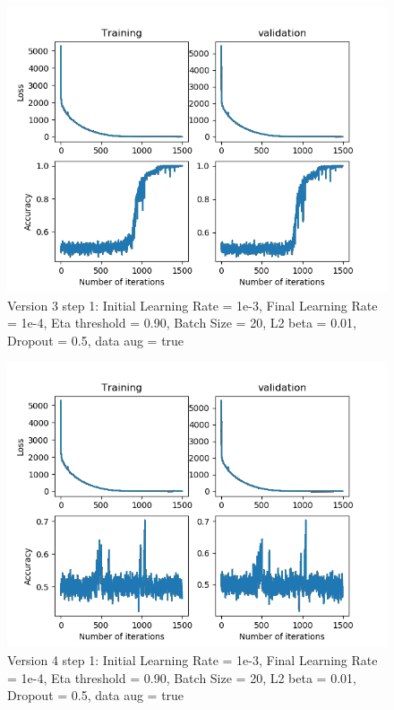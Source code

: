 \documentclass[12pt,reqno]{amsart}
\numberwithin{equation}{section}
\begin{document}
\begin{enumerate}
\begin{figure}[H]
\centering
\includegraphics[scale=0.6]{data_liquid25_version3_step1}
\caption{Version 3 step 1: Initial Learning Rate = 1e-3, Final Learning Rate = 1e-4, Eta threshold = 0.90, Batch Size = 20, L2 beta = 0.01, Dropout = 0.5, data aug = true}
\end{figure}

\begin{figure}[H]
\centering
\includegraphics[scale=0.6]{data_liquid25_version4_step1}
\caption{Version 4 step 1: Initial Learning Rate = 1e-3, Final Learning Rate = 1e-4, Eta threshold = 0.90, Batch Size = 20, L2 beta = 0.01, Dropout = 0.5, data aug = true}
\end{figure}


\end{enumerate}
\end{document}
